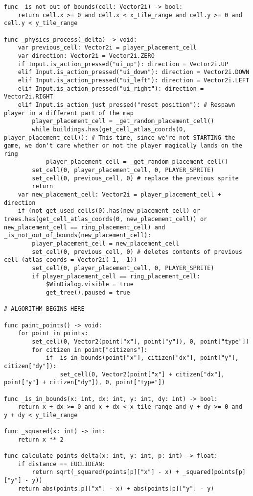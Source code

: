 \begin{lstlisting}
func _is_not_out_of_bounds(cell: Vector2i) -> bool:
	return cell.x >= 0 and cell.x < x_tile_range and cell.y >= 0 and cell.y < y_tile_range

func _physics_process(_delta) -> void:
	var previous_cell: Vector2i = player_placement_cell
	var direction: Vector2i = Vector2i.ZERO
	if Input.is_action_pressed("ui_up"): direction = Vector2i.UP
	elif Input.is_action_pressed("ui_down"): direction = Vector2i.DOWN
	elif Input.is_action_pressed("ui_left"): direction = Vector2i.LEFT
	elif Input.is_action_pressed("ui_right"): direction = Vector2i.RIGHT
	elif Input.is_action_just_pressed("reset_position"): # Respawn player in a different part of the map
		player_placement_cell = _get_random_placement_cell()
		while buildings.has(get_cell_atlas_coords(0, player_placement_cell)): # This time, since we're not STARTING the game, we don't care whether or not the player magically lands on the ring
			player_placement_cell = _get_random_placement_cell()
		set_cell(0, player_placement_cell, 0, PLAYER_SPRITE)
		set_cell(0, previous_cell, 0) # replace the previous sprite
		return
	var new_placement_cell: Vector2i = player_placement_cell + direction
	if (not get_used_cells(0).has(new_placement_cell) or trees.has(get_cell_atlas_coords(0, new_placement_cell)) or new_placement_cell == ring_placement_cell) and _is_not_out_of_bounds(new_placement_cell):
		player_placement_cell = new_placement_cell
		set_cell(0, previous_cell, 0) # deletes contents of previous cell (atlas_coords = Vector2i(-1, -1))
		set_cell(0, player_placement_cell, 0, PLAYER_SPRITE)
		if player_placement_cell == ring_placement_cell:
			$WinDialog.visible = true
			get_tree().paused = true

# ALGORITHM BEGINS HERE

func paint_points() -> void:
	for point in points:
		set_cell(0, Vector2(point["x"], point["y"]), 0, point["type"])
		for citizen in point["citizens"]:
			if _is_in_bounds(point["x"], citizen["dx"], point["y"], citizen["dy"]):
				set_cell(0, Vector2(point["x"] + citizen["dx"], point["y"] + citizen["dy"]), 0, point["type"])

func _is_in_bounds(x: int, dx: int, y: int, dy: int) -> bool:
	return x + dx >= 0 and x + dx < x_tile_range and y + dy >= 0 and  y + dy < y_tile_range

func _squared(x: int) -> int:
	return x ** 2

func calculate_points_delta(x: int, y: int, p: int) -> float:
	if distance == EUCLIDEAN:
		return sqrt(_squared(points[p]["x"] - x) + _squared(points[p]["y"] - y))
	return abs(points[p]["x"] - x) + abs(points[p]["y"] - y)


\end{lstlisting}

